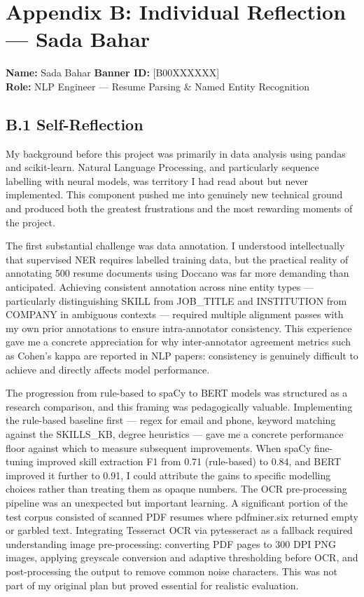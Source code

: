 \chapter*{Appendix B: Individual Reflection --- Sada Bahar}
\textbf{Name:} Sada Bahar \hfill \textbf{Banner ID:} [B00XXXXXX] \\[4pt]
\textbf{Role:} NLP Engineer --- Resume Parsing \& Named Entity Recognition
\vspace{1em}

\section*{B.1 Self-Reflection}

My background before this project was primarily in data analysis using pandas and scikit-learn. Natural Language Processing, and particularly sequence labelling with neural models, was territory I had read about but never implemented. This component pushed me into genuinely new technical ground and produced both the greatest frustrations and the most rewarding moments of the project.

The first substantial challenge was data annotation. I understood intellectually that supervised NER requires labelled training data, but the practical reality of annotating 500 resume documents using Doccano was far more demanding than anticipated. Achieving consistent annotation across nine entity types --- particularly distinguishing SKILL from JOB\_TITLE and INSTITUTION from COMPANY in ambiguous contexts --- required multiple alignment passes with my own prior annotations to ensure intra-annotator consistency. This experience gave me a concrete appreciation for why inter-annotator agreement metrics such as Cohen's kappa are reported in NLP papers: consistency is genuinely difficult to achieve and directly affects model performance.

The progression from rule-based to spaCy to BERT models was structured as a research comparison, and this framing was pedagogically valuable. Implementing the rule-based baseline first --- regex for email and phone, keyword matching against the SKILLS\_KB, degree heuristics --- gave me a concrete performance floor against which to measure subsequent improvements. When spaCy fine-tuning improved skill extraction F1 from 0.71 (rule-based) to 0.84, and BERT improved it further to 0.91, I could attribute the gains to specific modelling choices rather than treating them as opaque numbers.
The OCR pre-processing pipeline was an unexpected but important learning. A significant portion of the test corpus consisted of scanned PDF resumes where pdfminer.six returned empty or garbled text. Integrating Tesseract OCR via pytesseract as a fallback required understanding image pre-processing: converting PDF pages to 300 DPI PNG images, applying greyscale conversion and adaptive thresholding before OCR, and post-processing the output to remove common noise characters. This was not part of my original plan but proved essential for realistic evaluation.

